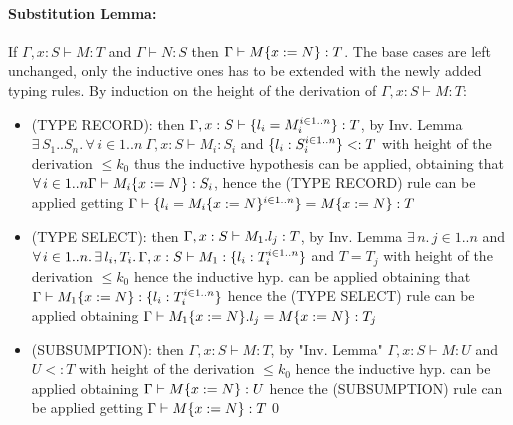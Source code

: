 \paragraph*{Substitution Lemma:\\}
If $\Gamma, x: S \vdash M: T$ and $\Gamma \vdash N: S$ then $\Gamma \vdash M\{x:=N\}: T$.
The base cases are left unchanged, only the inductive ones has to be extended with the newly
added typing rules.
By induction on the height of the derivation of $\Gamma, x: S \vdash M: T$:
\begin{itemize}
	\item (TYPE RECORD): then $\Gamma, x: S \vdash \{l_i=M_i^{i \in 1..n}\}: T$, by Inv. Lemma
	      $\exists\, S_1..S_n.\,\forall\, i \in 1..n\ \Gamma, x: S \vdash M_i: S_i$ and
	      $\{l_i: S_i^{i \in 1..n}\} <: T$ with height of the derivation $\le k_0$ thus the
	      inductive hypothesis can be applied, obtaining that
	      $\forall\, i \in 1..n \Gamma \vdash M_i\{x:=N\}: S_i$, hence the (TYPE RECORD) rule
	      can be applied getting
	      $\Gamma \vdash \{l_i = M_i\{x:=N\}^{i \in 1..n}\} = M\{x:=N\} : T$
	\item (TYPE SELECT): then $\Gamma, x: S \vdash M_1.l_j: T$, by Inv. Lemma
	      $\exists\, n.\, j \in 1..n$ and
	      $\forall\, i \in 1..n.\, \exists\, l_i, T_i.\, \Gamma, x: S \vdash M_1: \{l_i: T_i^{i \in 1..n}\}$
	      and $T = T_j$ with height of the derivation $\le k_0$ hence the inductive hyp. can be
	      applied obtaining that
	      $\Gamma \vdash M_1\{x:=N\}: \{l_i: T_i^{i \in 1..n}\}$ hence the (TYPE SELECT) rule
	      can be applied obtaining $\Gamma \vdash M_1\{x:=N\}.l_j = M\{x:=N\}: T_j$
	\item (SUBSUMPTION): then $\Gamma, x:S \vdash M: T$, by "Inv. Lemma" $\Gamma, x: S \vdash M: U$
	      and $U <: T$ with height of the derivation $\le k_0$ hence the inductive hyp. can be
	      applied obtaining $\Gamma \vdash M\{x:=N\}: U$ hence the (SUBSUMPTION) rule can
	      be applied getting $\Gamma \vdash M\{x:=N\}: T$\qed
\end{itemize}

